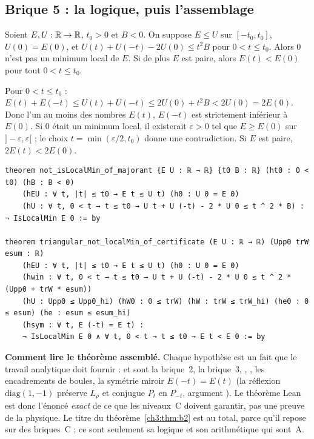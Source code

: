 \subsection{Brique 5 : la logique, puis l'assemblage}\label{ch3:sec:logique}
\begin{lemma}\label{ch3:lem:logique}
Soient $E,U:\mathbb{R}\to\mathbb{R}$, $t_0>0$ et $B<0$. On suppose $E\le U$ sur $[-t_0,t_0]$, $U(0)=E(0)$, et
$U(t)+U(-t)-2U(0)\le t^2B$ pour $0<t\le t_0$. Alors $0$ n'est pas un minimum local de $E$. Si de plus $E$ est paire,
alors $E(t)<E(0)$ pour tout $0<t\le t_0$. \tierAs
\end{lemma}
\begin{humanproof}
Pour $0<t\le t_0$ : $E(t)+E(-t)\le U(t)+U(-t)\le2U(0)+t^2B<2U(0)=2E(0)$. Donc l'un au moins des nombres $E(t)$, $E(-t)$
est strictement inférieur à $E(0)$. Si $0$ était un minimum local, il existerait $\varepsilon>0$ tel que $E\ge E(0)$ sur
$]-\varepsilon,\varepsilon[$ ; le choix $t=\min(\varepsilon/2,t_0)$ donne une contradiction. Si $E$ est paire,
$2E(t)<2E(0)$.
\end{humanproof}
\begin{leanbox}
\begin{lstlisting}[style=chIIIlean]
theorem not_isLocalMin_of_majorant {E U : ℝ → ℝ} {t0 B : ℝ} (ht0 : 0 < t0) (hB : B < 0)
    (hEU : ∀ t, |t| ≤ t0 → E t ≤ U t) (h0 : U 0 = E 0)
    (hU : ∀ t, 0 < t → t ≤ t0 → U t + U (-t) - 2 * U 0 ≤ t ^ 2 * B) : ¬ IsLocalMin E 0 := by

theorem triangular_not_localMin_of_certificate (E U : ℝ → ℝ) (Upp0 trW esum : ℝ)
    (hEU : ∀ t, |t| ≤ t0 → E t ≤ U t) (h0 : U 0 = E 0)
    (hwin : ∀ t, 0 < t → t ≤ t0 → U t + U (-t) - 2 * U 0 ≤ t ^ 2 * (Upp0 + trW * esum))
    (hU : Upp0 ≤ Upp0_hi) (hW0 : 0 ≤ trW) (hW : trW ≤ trW_hi) (he0 : 0 ≤ esum) (he : esum ≤ esum_hi)
    (hsym : ∀ t, E (-t) = E t) :
    ¬ IsLocalMin E 0 ∧ ∀ t, 0 < t → t ≤ t0 → E t < E 0 := by
\end{lstlisting}
\end{leanbox}
\noindent \textbf{Comment lire le théorème assemblé.} Chaque hypothèse est un fait que le travail analytique doit
fournir :  et  sont la brique~2,  la brique~3, , ,  les
encadrements de boules,  la symétrie miroir $E(-t)=E(t)$ (la réflexion $\mathrm{diag}(1,-1)$ préserve $L_\rho$
et conjugue $P_t$ en $P_{-t}$, argument \tierC). Le théorème Lean est donc l'énoncé \emph{exact} de ce que les niveaux~C
doivent garantir, pas une preuve de la physique. Le titre du théorème~\ref{ch3:thm:b2} est \tierC{} au total, parce
qu'il repose sur des briques~C ; ce sont seulement sa logique et son arithmétique qui sont~A.

